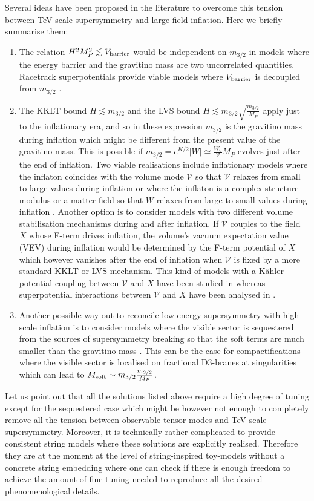 \documentclass[11pt,a4paper]{article}
\newcommand{\ben}{\begin{enumerate}}
\newcommand{\een}{\end{enumerate}}
\newcommand\vo{{\mathcal{V}}}
\begin{document}
Several ideas have been proposed in the literature to overcome this tension between TeV-scale supersymmetry and large field inflation. Here we briefly summarise them:
\ben
\item The relation $H^2 M_P^2\lesssim V_{\rm barrier}$ would be independent on $m_{3/2}$ in models where the energy barrier and the gravitino mass are two uncorrelated quantities. Racetrack superpotentials provide viable models where $V_{\rm barrier}$ is decoupled from $m_{3/2}$ \cite{Kallosh:2004yh}.

\item The KKLT bound $H\lesssim m_{3/2}$ and the LVS bound $H\lesssim m_{3/2}\sqrt{\frac{m_{3/2}}{M_P}}$ apply just to the inflationary era, and so in these expression $m_{3/2}$ is the gravitino mass during inflation which might be different from the present value of the gravitino mass. This is possible if $m_{3/2}= e^{K/2} |W| \simeq \frac{W_0}{\vo} M_P$ evolves just after the end of inflation. Two viable realisations include inflationary models where the inflaton coincides with the volume mode $\vo$ so that $\vo$ relaxes from small to large values during inflation \cite{Conlon:2008cj} or where the inflaton is a complex structure modulus or a matter field so that $W$ relaxes from large to small values during inflation \cite{He:2010uk}. Another option is to consider models with two different volume stabilisation mechanisms during and after inflation. If $\vo$ couples to the field $X$ whose F-term drives inflation, the volume's vacuum expectation value (VEV) during inflation would be determined by the F-term potential of $X$ which however vanishes after the end of inflation when $\vo$ is fixed by a more standard KKLT or LVS mechanism. This kind of models with a K\"ahler potential coupling between $\vo$ and $X$ have been studied in \cite{Antusch:2011wu} whereas superpotential interactions between $\vo$ and $X$ have been analysed in \cite{Yamada:2012tj}.

\item Another possible way-out to reconcile low-energy supersymmetry with high scale inflation is to consider models where the visible sector is sequestered from the sources of supersymmetry breaking so that the soft terms are much smaller than the gravitino mass \cite{Seq}. This can be the case for compactifications where the visible sector is localised on fractional D3-branes at singularities which can lead to $M_{\rm soft}\sim m_{3/2}\frac{m_{3/2}}{M_P}$.
\een 

Let us point out that all the solutions listed above require a high degree of tuning except for the sequestered case which might be however not enough to completely remove all the tension between observable tensor modes and TeV-scale supersymmetry. Moreover, it is technically rather complicated to provide consistent string models where these solutions are explicitly realised. Therefore they are at the moment at the level of string-inspired toy-models without a concrete string embedding where one can check if there is enough freedom to achieve the amount of fine tuning needed to reproduce all the desired phenomenological details.
\end{document}

